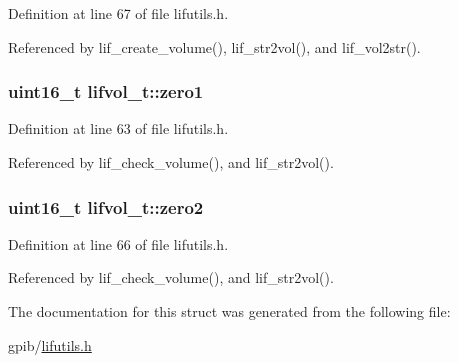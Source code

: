Definition at line 67 of file lifutils.\+h.



Referenced by lif\+\_\+create\+\_\+volume(), lif\+\_\+str2vol(), and lif\+\_\+vol2str().

\subsubsection[{\texorpdfstring{zero1}{zero1}}]{\setlength{\rightskip}{0pt plus 5cm}uint16\+\_\+t lifvol\+\_\+t\+::zero1}\hypertarget{structlifvol__t_a5e749ae4bff79deaa813966cff04f431}{}\label{structlifvol__t_a5e749ae4bff79deaa813966cff04f431}


Definition at line 63 of file lifutils.\+h.



Referenced by lif\+\_\+check\+\_\+volume(), and lif\+\_\+str2vol().

\subsubsection[{\texorpdfstring{zero2}{zero2}}]{\setlength{\rightskip}{0pt plus 5cm}uint16\+\_\+t lifvol\+\_\+t\+::zero2}\hypertarget{structlifvol__t_ac05fef8e2c908110de7083d7afbfdb37}{}\label{structlifvol__t_ac05fef8e2c908110de7083d7afbfdb37}


Definition at line 66 of file lifutils.\+h.



Referenced by lif\+\_\+check\+\_\+volume(), and lif\+\_\+str2vol().



The documentation for this struct was generated from the following file\+:\begin{DoxyCompactItemize}
\item 
gpib/\hyperlink{lifutils_8h}{lifutils.\+h}\end{DoxyCompactItemize}

